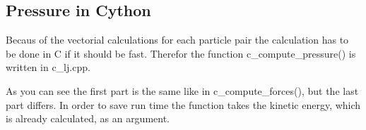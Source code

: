 \subsection*{Pressure in Cython}

Becaus of the vectorial calculations for each particle pair the calculation has to be done in C if it should be fast. 
Therefor the function c\_compute\_pressure() is written in c\_lj.cpp.


As you can see the first part is the same like in c\_compute\_forces(), but the last part differs.
In order to save run time the function takes the kinetic energy, which is already calculated, as an argument.